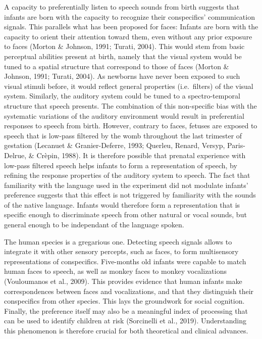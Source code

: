 \documentclass[
  man]{apa6}
\begin{document}
A capacity to preferentially listen to speech sounds from birth suggests that infants are born with the capacity to recognize their conspecifics' communication signals. This parallels what has been proposed for faces: Infants are born with the capacity to orient their attention toward them, even without any prior exposure to faces (Morton \& Johnson, 1991; Turati, 2004). This would stem from basic perceptual abilities present at birth, namely that the visual system would be tuned to a spatial structure that correspond to those of faces (Morton \& Johnson, 1991; Turati, 2004). As newborns have never been exposed to such visual stimuli before, it would reflect general properties (i.e.~filters) of the visual system. Similarly, the auditory system could be tuned to a spectro-temporal structure that speech presents. The combination of this non-specific bias with the systematic variations of the auditory environment would result in preferential responses to speech from birth. However, contrary to faces, fetuses are exposed to speech that is low-pass filtered by the womb throughout the last trimester of gestation (Lecanuet \& Granier-Deferre, 1993; Querleu, Renard, Versyp, Paris-Delrue, \& Crèpin, 1988). It is therefore possible that prenatal experience with low-pass filtered speech helps infants to form a representation of speech, by refining the response properties of the auditory system to speech.
The fact that familiarity with the language used in the experiment did not modulate infants' preference suggests that this effect is not triggered by familiarity with the sounds of the native language. Infants would therefore form a representation that is specific enough to discriminate speech from other natural or vocal sounds, but general enough to be independant of the language spoken.

The human species is a gregarious one. Detecting speech signals allows to integrate it with other sensory percepts, such as faces, to form multisensory representations of conspecifics. Five-months old infants were capable to match human faces to speech, as well as monkey faces to monkey vocalizations (Vouloumanos et al., 2009). This provides evidence that human infants make correspondences between faces and vocalizations, and that they distinguish their conspecifics from other species. This lays the groundwork for social cognition. Finally, the preference itself may also be a meaningful index of processing that can be used to identify children at risk (Sorcinelli et al., 2019). Understanding this phenomenon is therefore crucial for both theoretical and clinical advances.
\end{document}
